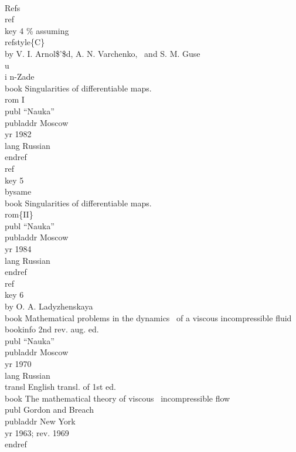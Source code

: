\pagewidth{23pc}
\beginexample{\exindent=0pt}
\\Refs
\\ref\\key 4 \% assuming \\refstyle\{C\}
\\by V. I. Arnol\$'\$d, A. N. Varchenko,
\ and S. M. Guse\\u\\i n-Zade
\\book Singularities of differentiable maps.~\\rom I
\\publ ``Nauka'' \\publaddr Moscow \\yr 1982
\\lang Russian
\\endref
\ {}
\\ref\\key 5\\bysame
\\book Singularities of differentiable maps.~\\rom\{II\}
\\publ ``Nauka'' \\publaddr Moscow \\yr 1984
\\lang Russian
\\endref
\ {}
\\ref\\key 6
\\by O. A. Ladyzhenskaya
\\book Mathematical problems in the dynamics
\ of a viscous incompressible fluid
\\bookinfo 2nd rev. aug. ed.
\\publ ``Nauka'' \\publaddr Moscow \\yr 1970
\\lang Russian
\\transl English transl. of 1st ed.
\\book The mathematical theory of viscous
\ incompressible flow
\\publ Gordon and Breach \\publaddr New York
\\yr 1963; rev. 1969
\\endref
\endexample

\newpage


